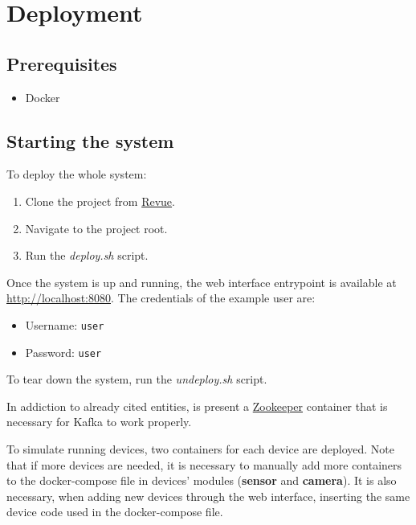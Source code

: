 \documentclass{scrartcl}
\begin{document}
    \section{Deployment}

    \subsection{Prerequisites}

    \begin{itemize}
        \item Docker
    \end{itemize}

    \subsection{Starting the system}

    To deploy the whole system:
    \begin{enumerate}
        \item Clone the project from \href{https://github.com/Mala1180/revue/}{Revue}.
        \item Navigate to the project root.
        \item Run the \textit{deploy.sh} script.
    \end{enumerate}

    Once the system is up and running, the web interface entrypoint is available at \href{http://localhost:8080}{http://localhost:8080}.
    The credentials of the example user are:
    \begin{itemize}
        \item Username: \texttt{user}
        \item Password: \texttt{user}
    \end{itemize}

    To tear down the system, run the \textit{undeploy.sh} script.

    In addiction to already cited entities, is present a \href{https://zookeeper.apache.org}{Zookeeper} container that is necessary for Kafka to work properly.

    To simulate running devices, two containers for each device are deployed.
    Note that if more devices are needed, it is necessary to manually add more containers to the docker-compose file in devices' modules (\textbf{sensor} and \textbf{camera}).
    It is also necessary, when adding new devices through the web interface, inserting the same device code used in the docker-compose file.
\end{document}

